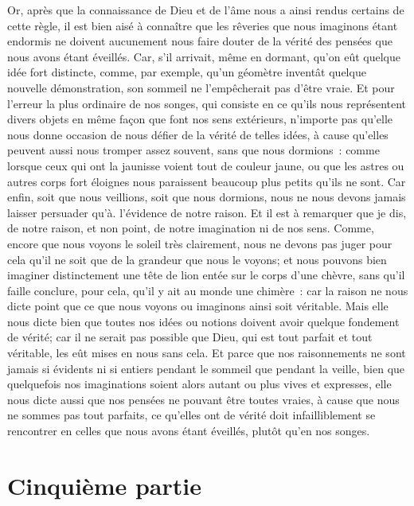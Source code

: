 \documentclass[french,twoside]{book} %
\newcommand\chapteropen{} %
\newcommand\chapterclose{} %
\begin{document}
Or, après que la connaissance de Dieu et de l'âme nous a ainsi rendus certains de cette règle, il est bien aisé à connaître que les rêveries que nous imaginons étant endormis ne doivent aucunement nous faire douter de la vérité des pensées que nous avons étant éveillés. Car, s'il arrivait, même en dormant, qu'on eût quelque idée fort distincte, comme, par exemple, qu'un géomètre inventât quelque nouvelle démonstration, son sommeil ne l'empêcherait pas d'être vraie. Et pour l'erreur la plus ordinaire de nos songes, qui consiste en ce qu'ils nous représentent divers objets en même façon que font nos sens extérieurs, n'importe pas qu'elle nous donne occasion de nous défier de la vérité de telles idées, à cause qu'elles peuvent aussi nous tromper assez souvent, sans que nous dormions : comme lorsque ceux qui ont la jaunisse voient tout de couleur jaune, ou que les astres ou autres corps fort éloignes nous paraissent beaucoup plus petits qu'ils ne sont. Car enfin, soit que nous veillions, soit que nous dormions, nous ne nous devons jamais laisser persuader qu'à. l'évidence de notre raison. Et il est à remarquer que je dis, de notre raison, et non point, de notre imagination ni de nos sens. Comme, encore que nous voyons le soleil très clairement, nous ne devons pas juger pour cela qu'il ne soit que de la grandeur que nous le voyons; et nous pouvons bien imaginer distinctement une tête de lion entée sur le corps d'une chèvre, sans qu'il faille conclure, pour cela, qu'il y ait au monde une chimère : car la raison ne nous dicte point que ce que nous voyons ou imaginons ainsi soit véritable. Mais elle nous dicte bien que toutes nos idées ou notions doivent avoir quelque fondement de vérité; car il ne serait pas possible que Dieu, qui est tout parfait et tout véritable, les eût mises en nous sans cela. Et parce que nos raisonnements ne sont jamais si évidents ni si entiers pendant le sommeil que pendant la veille, bien que quelquefois nos imaginations soient alors autant ou plus vives et expresses, elle nous dicte aussi que nos pensées ne pouvant être toutes vraies, à cause que nous ne sommes pas tout parfaits, ce qu'elles ont de vérité doit infailliblement se rencontrer en celles que nous avons étant éveillés, plutôt qu'en nos songes.
\chapterclose


\chapteropen
\renewcommand{\leftmark}{Cinquième partie}
\chapter[Cinquième partie]{Cinquième partie}
\end{document}
